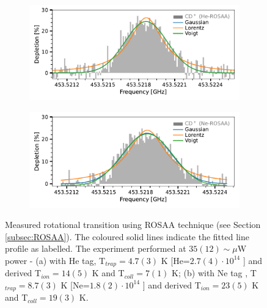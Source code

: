 \begin{figure}[!htb]
    \centering
    \begin{subfigure}[b]{0.49\textwidth}
        \centering
        \includegraphics[width=1\textwidth]{figures/measurements/THz/thz_CD+_He.pdf}
        \caption{}
        \label{fig:thz:HeCD+}
    \end{subfigure}
    \hfill
    \begin{subfigure}[b]{0.49\textwidth}
        \centering
        \includegraphics[width=1\textwidth]{figures/measurements/THz/thz_CD+_Ne.pdf}
        \caption{}
        \label{fig:thz:NeCD+}
    \end{subfigure}
    \caption{Measured \CD \CDline rotational transition using ROSAA technique  (see Section \ref{subsec:ROSAA}). The coloured solid lines indicate the fitted line profile as labelled. The experiment performed at $35(12) \sim \mu$W power - (a) with He tag, T$_{trap}=4.7(3)$ K [He=$2.7(4) \cdot 10^{14}$ \percc] and derived T$_{ion} = 14(5)$ K and T$_{coll} = 7(1)$ K; (b) with Ne tag , T$_{trap}=8.7(3)$ K [Ne=$1.8(2)\cdot 10^{14}$ \percc] and derived T$_{ion} = 23(5)$ K and T$_{coll} = 19(3)$ K.}
    \label{fig:thz}
\end{figure}